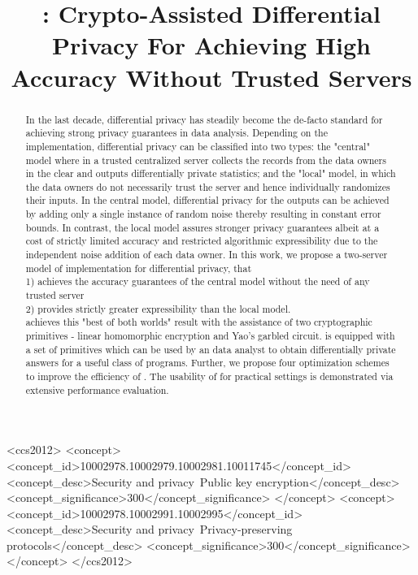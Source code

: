 \documentclass[sigconf]{acmart}
\begin{document}
\title{\system: Crypto-Assisted Differential Privacy For Achieving High Accuracy Without Trusted Servers}
\author{}
\begin{abstract}
In the last decade, differential privacy has steadily become the de-facto standard for achieving strong privacy guarantees in data analysis. Depending on the implementation, differential privacy can be classified into two types: the "central" model where in a trusted centralized server collects the records from the data owners in the clear and outputs differentially private statistics; and the "local" model, in which the data owners do not necessarily trust the server and hence individually randomizes their inputs.  In the central model, differential privacy for the outputs can be achieved by adding only a single instance of random noise thereby resulting in constant error bounds. In contrast, the local model assures stronger privacy guarantees  albeit at a cost of strictly limited accuracy and restricted algorithmic expressibility due to the independent noise addition of each data owner. In this work, we propose a  two-server model of implementation for differential privacy, \system  that  \\
1) achieves the accuracy guarantees of the central model without the need of any trusted server \\
2) provides strictly greater expressibility than the local model. \\
\system achieves this "best of both worlds" result with the assistance of two cryptographic primitives - linear homomorphic encryption and  Yao's garbled circuit. \system is equipped with a set of primitives which can be used by an data analyst to obtain differentially private answers for a useful class of programs. Further, we propose four optimization schemes to improve the efficiency of \system.  The  usability of \system for practical settings is demonstrated via extensive performance evaluation.
\end{abstract}
\begin{CCSXML}
<ccs2012>
<concept>
<concept_id>10002978.10002979.10002981.10011745</concept_id>
<concept_desc>Security and privacy~Public key encryption</concept_desc>
<concept_significance>300</concept_significance>
</concept>
<concept>
<concept_id>10002978.10002991.10002995</concept_id>
<concept_desc>Security and privacy~Privacy-preserving protocols</concept_desc>
<concept_significance>300</concept_significance>
</concept>
</ccs2012>
\end{CCSXML}
\end{document}
